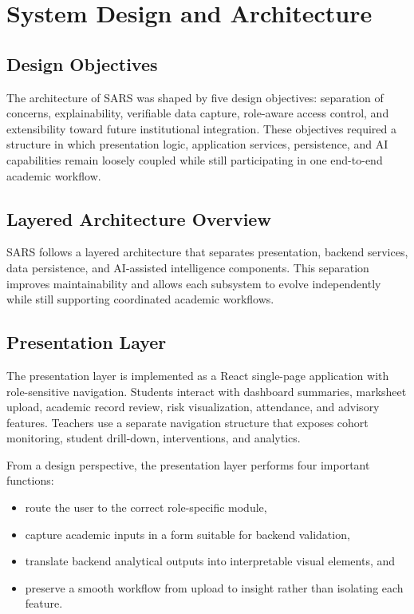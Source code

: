\chapter{System Design and Architecture}

\section{Design Objectives}
The architecture of SARS was shaped by five design objectives: separation of concerns, explainability, verifiable data capture, role-aware access control, and extensibility toward future institutional integration. These objectives required a structure in which presentation logic, application services, persistence, and AI capabilities remain loosely coupled while still participating in one end-to-end academic workflow.

\section{Layered Architecture Overview}
SARS follows a layered architecture that separates presentation, backend services, data persistence, and AI-assisted intelligence components. This separation improves maintainability and allows each subsystem to evolve independently while still supporting coordinated academic workflows.


\section{Presentation Layer}
The presentation layer is implemented as a React single-page application with role-sensitive navigation. Students interact with dashboard summaries, marksheet upload, academic record review, risk visualization, attendance, and advisory features. Teachers use a separate navigation structure that exposes cohort monitoring, student drill-down, interventions, and analytics.

From a design perspective, the presentation layer performs four important functions:
\begin{itemize}[leftmargin=*]
\item route the user to the correct role-specific module,
\item capture academic inputs in a form suitable for backend validation,
\item translate backend analytical outputs into interpretable visual elements, and
\item preserve a smooth workflow from upload to insight rather than isolating each feature.
\end{itemize}

